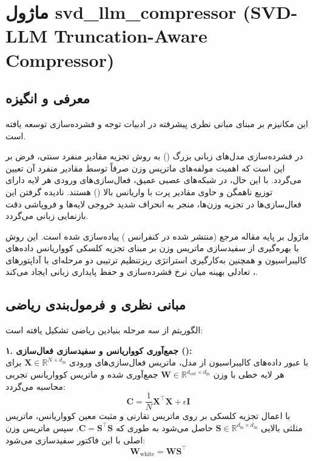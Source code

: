 \section{ماژول svd\_llm\_compressor (SVD-LLM Truncation-Aware Compressor)}
\label{sec:module_svd_llm_compressor}

\subsection{معرفی و انگیزه}
این مکانیزم بر مبنای مبانی نظری پیشرفته در ادبیات توجه و فشرده‌سازی \cite{wang2024svdllm} توسعه یافته است.

در فشرده‌سازی مدل‌های زبانی بزرگ () به روش تجزیه مقادیر منفرد سنتی، فرض بر این است که اهمیت مولفه‌های ماتریس وزن صرفاً توسط مقادیر منفرد آن تعیین می‌گردد. با این حال، در شبکه‌های عصبی عمیق، فعال‌سازی‌های ورودی هر لایه دارای توزیع ناهمگن و حاوی مقادیر پرت با واریانس بالا () هستند. نادیده گرفتن این فعال‌سازی‌ها در تجزیه وزن‌ها، منجر به انحراف شدید خروجی لایه‌ها و فروپاشی دقت بازنمایی زبانی می‌گردد.

ماژول  بر پایه مقاله مرجع  (منتشر شده در کنفرانس ) پیاده‌سازی شده است. این روش با بهره‌گیری از سفیدسازی ماتریس وزن بر مبنای تجزیه کلسکی کوواریانس داده‌های کالیبراسیون و همچنین به‌کارگیری استراتژی ریزتنظیم ترتیبی دو مرحله‌ای با آداپتورهای ، تعادلی بهینه میان نرخ فشرده‌سازی و حفظ پایداری زبانی ایجاد می‌کند.

\subsection{مبانی نظری و فرمول‌بندی ریاضی}
الگوریتم  از سه مرحله بنیادین ریاضی تشکیل یافته است:

\textbf{۱. جمع‌آوری کوواریانس و سفیدسازی فعال‌سازی ():} \\
با عبور داده‌های کالیبراسیون از مدل، ماتریس فعال‌سازی‌های ورودی $\mathbf{X} \in \mathbb{R}^{N \times d_{\text{in}}}$ برای هر لایه خطی با وزن $\mathbf{W} \in \mathbb{R}^{d_{\text{out}} \times d_{\text{in}}}$ جمع‌آوری شده و ماتریس کوواریانس تجربی محاسبه می‌گردد:
\begin{equation}
\mathbf{C} = \frac{1}{N} \mathbf{X}^\top \mathbf{X} + \epsilon \mathbf{I}
\end{equation}
با اعمال تجزیه کلسکی بر روی ماتریس تقارنی و مثبت معین کوواریانس، ماتریس مثلثی بالایی $\mathbf{S} \in \mathbb{R}^{d_{\text{in}} \times d_{\text{in}}}$ حاصل می‌شود به طوری که $\mathbf{C} = \mathbf{S}^\top \mathbf{S}$. سپس ماتریس وزن اصلی با این فاکتور سفیدسازی می‌شود:
\begin{equation}
\mathbf{W}_{\text{white}} = \mathbf{W} \mathbf{S}^\top
\end{equation}

